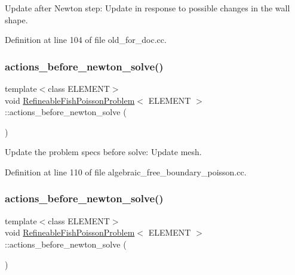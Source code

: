 Update after Newton step\+: Update in response to possible changes in the wall shape. 



Definition at line 104 of file old\+\_\+for\+\_\+doc.\+cc.

\mbox{\label{classRefineableFishPoissonProblem_a58098181f3b88c2fc65f24fb15c1a529}} 
\subsubsection{\texorpdfstring{actions\+\_\+before\+\_\+newton\+\_\+solve()}{actions\_before\_newton\_solve()}\hspace{0.1cm}{\footnotesize\ttfamily [1/2]}}
{\footnotesize\ttfamily template$<$class E\+L\+E\+M\+E\+NT$>$ \\
void \hyperlink{classRefineableFishPoissonProblem}{Refineable\+Fish\+Poisson\+Problem}$<$ E\+L\+E\+M\+E\+NT $>$\+::actions\+\_\+before\+\_\+newton\+\_\+solve (\begin{DoxyParamCaption}{ }\end{DoxyParamCaption})\hspace{0.3cm}{\ttfamily [inline]}}



Update the problem specs before solve\+: Update mesh. 



Definition at line 110 of file algebraic\+\_\+free\+\_\+boundary\+\_\+poisson.\+cc.

\mbox{\label{classRefineableFishPoissonProblem_a58098181f3b88c2fc65f24fb15c1a529}} 
\subsubsection{\texorpdfstring{actions\+\_\+before\+\_\+newton\+\_\+solve()}{actions\_before\_newton\_solve()}\hspace{0.1cm}{\footnotesize\ttfamily [2/2]}}
{\footnotesize\ttfamily template$<$class E\+L\+E\+M\+E\+NT$>$ \\
void \hyperlink{classRefineableFishPoissonProblem}{Refineable\+Fish\+Poisson\+Problem}$<$ E\+L\+E\+M\+E\+NT $>$\+::actions\+\_\+before\+\_\+newton\+\_\+solve (\begin{DoxyParamCaption}{ }\end{DoxyParamCaption})\hspace{0.3cm}{\ttfamily [inline]}}



